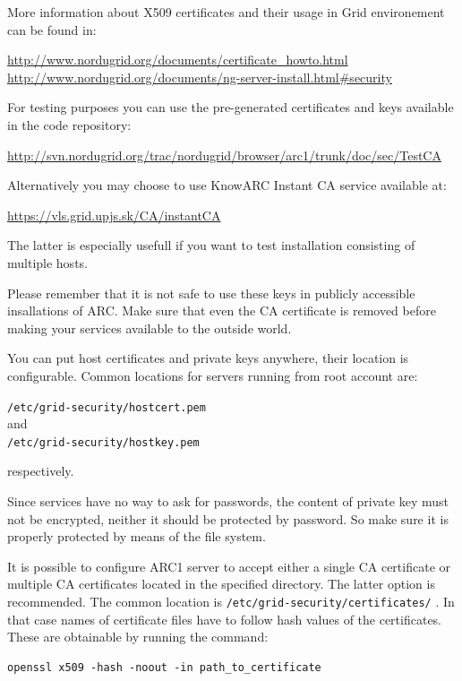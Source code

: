 \documentclass{article}                            %
\begin{document}
More information about X509 certificates and their usage in Grid environement
can be found in:

\url{http://www.nordugrid.org/documents/certificate_howto.html}\\
\url{http://www.nordugrid.org/documents/ng-server-install.html#security}

For testing purposes you can use the pre-generated certificates and keys
available in the code repository:

\url{http://svn.nordugrid.org/trac/nordugrid/browser/arc1/trunk/doc/sec/TestCA}

Alternatively you may choose to use KnowARC Instant CA service available at:

\url{https://vls.grid.upjs.sk/CA/instantCA}

The latter is especially usefull if you want to test installation consisting of
multiple hosts.

Please remember that it is not safe to use these keys in publicly accessible
insallations of ARC. Make sure that even the CA certificate is removed before
making your services available to the outside world.

You can put host certificates and private keys anywhere, their location is
configurable. Common locations for servers running from root account are:

\verb|/etc/grid-security/hostcert.pem| \\and\\
\verb|/etc/grid-security/hostkey.pem|

respectively.

\begin{framed}
Since services have no way to ask for passwords, the content of private key
must not be encrypted, neither it should be protected by password. So make sure
it is properly protected by means of the file system.
\end{framed}

It is possible to configure ARC1 server to accept either a single CA certificate
or multiple CA certificates located in the specified directory. The latter
option is recommended. The common location is
\texttt{/etc/grid-security/certificates/} . In that case names of certificate
files have to follow hash values of the certificates. These are obtainable by
running the command:

\begin{lstlisting}
openssl x509 -hash -noout -in path_to_certificate
\end{lstlisting}
\end{document}

